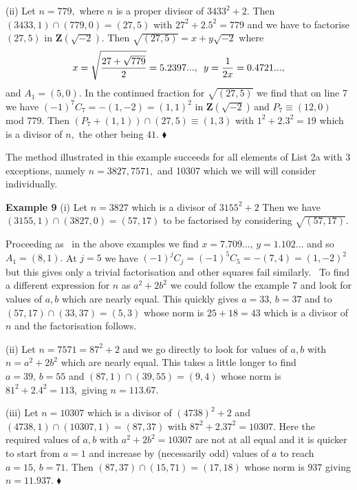 \documentclass[12pt]{article}
\begin{document}
(ii) Let $n=779,$ where $n$ is a proper divisor of $3433^{2}+2$. Then $%
\left( 3433,1\right) \cap \left( 779,0\right) =\left( 27,5\right) $ with $%
27^{2}+2.5^{2}=779$ and we have to factorise $\left( 27,5\right) $ in $%
\mathbf{Z}\left( \sqrt{-2}\right) .$ Then $\sqrt{\left( 27,5\right) }=x+y%
\sqrt{-2}$ where 
\begin{equation*}
x=\sqrt{\frac{27+\sqrt{779}}{2}}=5.2397...,\text{ \thinspace }y=\frac{1}{2x}%
=0.4721...,
\end{equation*}%
and $A_{1}=\left( 5,0\right) .$ In the continued fraction for $\sqrt{\left(
27,5\right) }$ we find that on line 7 we have $\left( -1\right)
^{7}C_{7}=-\left( 1,-2\right) =\left( 1,1\right) ^{2}$ in $\mathbf{Z}\left( 
\sqrt{-2}\right) \,$and $P_{7}\equiv \left( 12,0\right) $ mod $779$. Then $%
(P_{7}+\left( 1,1\right) )\cap \left( 27,5\right) \equiv \left( 1,3\right) $
with $1^{2}+2.3^{2}=19$ which is a divisor of $n,$ the other being $41.$ $%
\blacklozenge $

The method illustrated in this example succeeds for all elements of List 2a
with $3$ exceptions, namely $n=3827,7571,$ and 10307 which we will will
consider individually.

\textbf{Example 9 }(i) Let $n=3827$ which is a divisor of $3155^{2}+2$ Then
we have $\left( 3155,1\right) \cap \left( 3827,0\right) =\left( 57,17\right) 
$ to be factorised by considering $\sqrt{\left( 57,17\right) }.$

Proceeding as \ in the above examples we find $x=7.709...,\,y=1.102...$ and
so $A_{1}=\left( 8,1\right) .$ At $j=5$ we have $\left( -1\right)
^{j}C_{j}=\left( -1\right) ^{5}C_{5}=-\left( 7,4\right) =\left( 1,-2\right)
^{2}$ but this gives only a trivial factorisation and other squares fail
similarly. \ To find a different expression for $n$ as $a^{2}+2b^{2}$ we
could follow the example $7$ and look for values of $a,b$ which are nearly
equal. This quickly gives $a=33,\,b=37$ and to $\left( 57,17\right) \cap
\left( 33,37\right) =\left( 5,3\right) $ whose norm is $25+18=43$ which is a
divisor of $n$ and the factorisation follows.

(ii) Let $n=7571=87^{2}+2$ and we go directly to look for values of $a,b$
with $n=a^{2}+2b^{2}$ which are nearly equal. This takes a little longer to
find $a=39,\,b=55$ and $\left( 87,1\right) \cap \left( 39,55\right) =(9,4)$
whose norm is $81^{2}+2.4^{2}=113,$ giving $n=113.67.$

(iii) Let $n=10307$ which is a divisor of $\left( 4738\right) ^{2}+2$ and $%
\left( 4738,1\right) \cap \left( 10307,1\right) =\left( 87,37\right) $ with $%
87^{2}+2.37^{2}=10307.$ Here the required values of $a,b$ with $%
a^{2}+2b^{2}=10307$ are not at all equal and it is quicker to start from $%
a=1 $ and increase by (necessarily odd) values of $a$ to reach $a=15,\,b=71.$
Then $\left( 87,37\right) \cap \left( 15,71\right) =\left( 17,18\right) $
whose norm is $937$ giving $n=11.937.$ $\blacklozenge $
\end{document}
